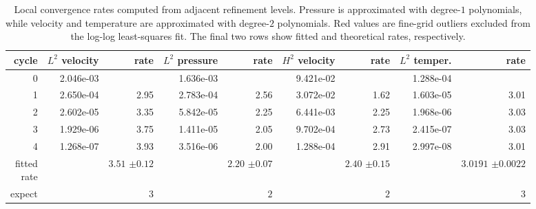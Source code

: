 \begin{table}[htbp]
\centering
\begin{tabular}{|r|r|r|r|r|r|r|r|r|}
\hline
cycle & \makecell{$L^{2}$\\velocity} & rate & \makecell{$L^{2}$\\pressure} & rate & \makecell{$H^{2}$\\velocity} & rate & \makecell{$L^{2}$\\temper.} & rate \\ \hline
0 & 2.046e-03 & \makecell{--} & 1.636e-03 & \makecell{--} & 9.421e-02 & \makecell{--} & 1.288e-04 & \makecell{--} \\ \hline
1 & 2.650e-04 & 2.95 & 2.783e-04 & 2.56 & 3.072e-02 & 1.62 & 1.603e-05 & 3.01 \\ \hline
2 & 2.602e-05 & 3.35 & 5.842e-05 & 2.25 & 6.441e-03 & 2.25 & 1.968e-06 & 3.03 \\ \hline
3 & 1.929e-06 & 3.75 & 1.411e-05 & 2.05 & 9.702e-04 & 2.73 & 2.415e-07 & 3.03 \\ \hline
4 & 1.268e-07 & 3.93 & 3.516e-06 & 2.00 & 1.288e-04 & 2.91 & 2.997e-08 & 3.01 \\ \hline
\makecell[r]{fitted\\rate} & \makecell{--} & \makecell[r]{$3.51 $\\$\pm  0.12$} & \makecell{--} & \makecell[r]{$2.20 $\\$\pm  0.07$} & \makecell{--} & \makecell[r]{$2.40 $\\$\pm  0.15$} & \makecell{--} & \makecell[r]{$3.0191 $\\$\pm  0.0022$} \\ \hline
expect & \makecell{--} & $3$ & \makecell{--} & $2$ & \makecell{--} & $2$ & \makecell{--} & $3$ \\ \hline
\end{tabular}
\caption{Local convergence rates computed from adjacent refinement levels. Pressure is approximated with degree-$1$ polynomials, while velocity and temperature are approximated with degree-$2$ polynomials. Red values are fine-grid outliers excluded from the log-log least-squares fit. The final two rows show fitted and theoretical rates, respectively.}
\end{table}

